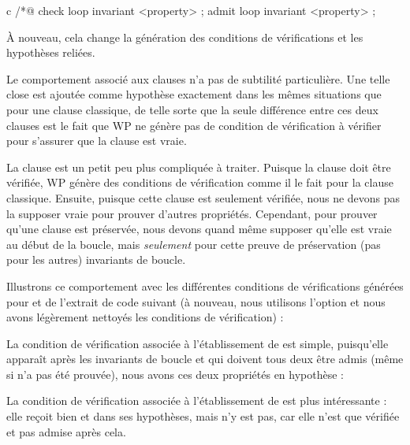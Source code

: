 \begin{CodeBlock}{c}
/*@ check loop invariant <property> ;
    admit loop invariant <property> ;
\end{CodeBlock}


À nouveau, cela change la génération des conditions de vérifications et les
hypothèses reliées.


Le comportement associé aux clauses  n'a pas
de subtilité particulière. Une telle close est ajoutée comme hypothèse exactement
dans les mêmes situations que pour une clause 
classique, de telle sorte que la seule différence entre ces deux clauses est le
fait que WP ne génère pas de condition de vérification à vérifier pour s'assurer
que la clause  est vraie.


La clause  est un petit peu plus compliquée à
traiter. Puisque la clause doit être vérifiée, WP génère des conditions de
vérification comme il le fait pour la clause 
classique. Ensuite, puisque cette clause est seulement vérifiée, nous ne devons
pas la supposer vraie pour prouver d'autres propriétés. Cependant, pour prouver
qu'une clause  est préservée, nous devons
quand même supposer qu'elle est vraie au début de la boucle, mais
\textit{seulement} pour cette preuve de préservation (pas pour les autres)
invariants de boucle.


Illustrons ce comportement avec les différentes conditions de vérifications
générées pour  et  de l'extrait de code suivant
(à nouveau, nous utilisons l'option  et nous avons
légèrement nettoyés les conditions de vérification) :




La condition de vérification associée à l'établissement de  est
simple, puisqu'elle apparaît après les invariants de boucle  et
 qui doivent tous deux être admis (même si  n'a
pas été prouvée), nous avons ces deux propriétés en hypothèse :




La condition de vérification associée à l'établissement de  est
plus intéressante : elle reçoit bien  et  dans
ses hypothèses, mais  n'y est pas, car elle n'est que vérifiée et
pas admise après cela.


